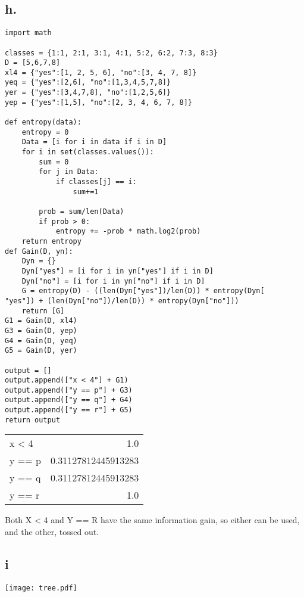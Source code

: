 \documentclass[11pt]{article}
\begin{document}
\subsection*{h.}
\label{sec:org0639e6b}
\begin{verbatim}
import math

classes = {1:1, 2:1, 3:1, 4:1, 5:2, 6:2, 7:3, 8:3}
D = [5,6,7,8]
xl4 = {"yes":[1, 2, 5, 6], "no":[3, 4, 7, 8]}
yeq = {"yes":[2,6], "no":[1,3,4,5,7,8]}
yer = {"yes":[3,4,7,8], "no":[1,2,5,6]}
yep = {"yes":[1,5], "no":[2, 3, 4, 6, 7, 8]}

def entropy(data):
    entropy = 0
    Data = [i for i in data if i in D]
    for i in set(classes.values()):
        sum = 0
        for j in Data:
            if classes[j] == i:
                sum+=1

        prob = sum/len(Data)
        if prob > 0:
            entropy += -prob * math.log2(prob)
    return entropy
def Gain(D, yn):
    Dyn = {}
    Dyn["yes"] = [i for i in yn["yes"] if i in D]
    Dyn["no"] = [i for i in yn["no"] if i in D]
    G = entropy(D) - ((len(Dyn["yes"])/len(D)) * entropy(Dyn[
"yes"]) + (len(Dyn["no"])/len(D)) * entropy(Dyn["no"]))
    return [G]
G1 = Gain(D, xl4)
G3 = Gain(D, yep)
G4 = Gain(D, yeq)
G5 = Gain(D, yer)

output = []
output.append(["x < 4"] + G1)
output.append(["y == p"] + G3)
output.append(["y == q"] + G4)
output.append(["y == r"] + G5)
return output
\end{verbatim}

\begin{center}
\begin{tabular}{lr}
x < 4 & 1.0\\
y == p & 0.31127812445913283\\
y == q & 0.31127812445913283\\
y == r & 1.0\\
\end{tabular}
\end{center}

Both X < 4 and Y == R have the same information gain, so either can be used, and the
other, tossed out.
\subsection*{i}
\label{sec:org1e4a0e2}
\begin{center}
\texttt{[image: tree.pdf]}
\end{center}
\end{document}
